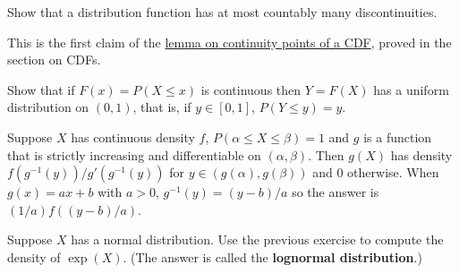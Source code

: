   \begin{exercise}[Durrett 1.2.3]
    Show that a distribution function has at most countably many discontinuities.
  \end{exercise}
  \begin{solution}
    This is the first claim of the \hyperref[thm:continuity-points-of-a-cdf-are-dense]{lemma on continuity points of a CDF}, proved in the section on CDFs. 
  \end{solution}

  \begin{exercise}[Durrett 1.2.4]
    Show that if $F(x) = P(X \leq x)$ is continuous then $Y = F(X)$ has a uniform distribution on $(0,1)$, that is, if $y \in [0, 1]$, $P(Y \leq y) = y$.
  \end{exercise}
  \begin{solution}
    
  \end{solution}

  \begin{exercise}[Durrett 1.2.5]
    Suppose $X$ has continuous density $f$, $P(\alpha \leq X \leq \beta) = 1$ and $g$ is a function that is strictly increasing and differentiable on $(\alpha, \beta)$. Then $g(X)$ has density $f(g^{-1}(y))/g'(g^{-1}(y))$ for $y \in (g(\alpha), g(\beta))$ and 0 otherwise. When $g(x) = ax + b$ with $a > 0$, $g^{-1}(y) = (y - b)/a$ so the answer is $(1/a)f((y - b)/a)$.
  \end{exercise}
  \begin{solution}
    
  \end{solution}

  \begin{exercise}[Durrett 1.2.6]
    Suppose $X$ has a normal distribution. Use the previous exercise to compute the density of $\exp(X)$. (The answer is called the \textbf{lognormal distribution}.)
  \end{exercise}
  \begin{solution}
    
  \end{solution}

